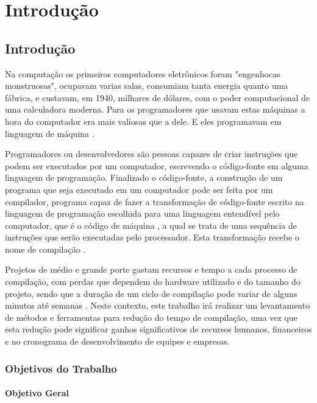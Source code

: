 \part{Introdução}

\chapter*[Introdução]{Introdução}

Na computação os primeiros computadores eletrônicos foram "engenhocas
 monstruosas", ocupavam varias salas, consumiam tanta energia quanto
 uma fábrica, e custavam, em 1940, milhares de dólares, com o poder
 computacional de uma calculadora moderna. Para os
 programadores que usavam estas máquinas a hora do computador era
 mais valiosas que a dele. E eles programavam em linguagem de
 máquina \cite[pág.5]{ref6}.

Programadores ou desenvolvedores são pessoas capazes de criar instruções
 que podem ser executados por um computador, escrevendo o código-fonte em
 alguma linguagem de programação. Finalizado o código-fonte, a construção
 de um programa que seja executado em um computador pode ser feita por um
 compilador, programa capaz de fazer a transformação de
 código-fonte escrito na linguagem de programação escolhida para uma linguagem
 entendível pelo computador, que é o código de máquina \cite[pág.5]{ref6}, a qual
 se trata de uma sequência de instruções que serão executadas  pelo
 processador. Esta transformação recebe o nome de compilação \cite[pág.1]{ref5}.

Projetos de médio e grande porte gastam recursos e tempo a cada processo
 de compilação, com perdas que dependem do hardware utilizado e do tamanho
 do projeto, sendo que a duração de um ciclo de compilação pode variar de
 alguns minutos até semanas \cite[pág.5]{ref6}. Neste contexto, este trabalho
 irá realizar um levantamento de métodos e ferramentas para redução do
 tempo de compilação, uma vez que esta redução pode significar ganhos
 significativos de recursos humanos, financeiros e no cronograma de
 desenvolvimento de equipes e empresas. 

\section*{Objetivos do Trabalho}

\subsection*{Objetivo Geral}

